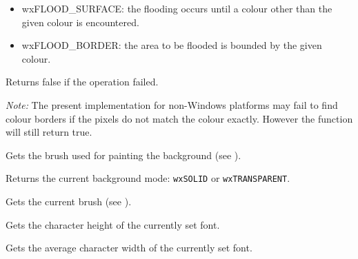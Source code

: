 \begin{itemize}\itemsep=0pt
\item wxFLOOD\_SURFACE: the flooding occurs until a colour other than the given colour is encountered.
\item wxFLOOD\_BORDER: the area to be flooded is bounded by the given colour.
\end{itemize}

Returns false if the operation failed.

{\it Note:} The present implementation for non-Windows platforms may fail to find
colour borders if the pixels do not match the colour exactly. However the
function will still return true.


\label{wxdcgetbackground}


Gets the brush used for painting the background (see ).


\label{wxdcgetbackgroundmode}


Returns the current background mode: {\tt wxSOLID} or {\tt wxTRANSPARENT}.




\label{wxdcgetbrush}


Gets the current brush (see ).


\label{wxdcgetcharheight}


Gets the character height of the currently set font.


\label{wxdcgetcharwidth}


Gets the average character width of the currently set font.


\label{wxdcgetclippingbox}



